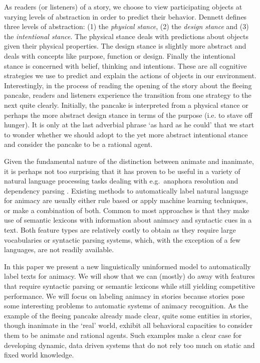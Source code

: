 \documentclass[a4paper,UKenglish]{oasics}
\begin{document}
As readers (or listeners) of a story, we choose to view participating
objects at varying levels of abstraction in order to predict their
behavior. Dennett \cite{dennett:96} defines three levels of
abstraction: (1) the \textit{physical stance}, (2) the \textit{design
  stance} and (3) the \textit{intentional stance}. The physical stance
deals with predictions about objects given their physical
properties. The design stance is slightly more abstract and deals with
concepts like purpose, function or design. Finally the intentional
stance is concerned with belief, thinking and intentions. These are
all cognitive strategies we use to predict and explain the actions of
objects in our environment. Interestingly, in the process of reading
the opening of the story about the fleeing pancake, readers and
listeners experience the transition from one strategy to the next
quite clearly. Initially, the pancake is interpreted from a physical
stance or perhaps the more abstract design stance in terms of the
purpose (i.e. to stave off hunger). It is only at the last adverbial
phrase `as hard as he could' that we start to wonder whether we should
adopt to the yet more abstract intentional stance and consider the
pancake to be a rational agent.

Given the fundamental nature of the distinction between animate and
inanimate, it is perhaps not too surprising that it has proven to be
useful in a variety of natural language processing tasks dealing with
e.g.\ anaphora resolution and dependency parsing
\cite{orasan:07,lee:13,ovr:niv:07}. Existing methods to automatically
label natural language for animacy are usually either rule based or apply
machine learning techniques, or make a combination of both. Common to
most approaches is that they make use of semantic lexicons with
information about animacy and syntactic cues in a text. Both feature
types are relatively costly to obtain as they require large
vocabularies or syntactic parsing systems, which, with the exception of a few languages, are not readily available.

In this paper we present a new linguistically uninformed model to
automatically label texts for animacy. We will show that we can (mostly)
do away with features that require syntactic parsing or semantic
lexicons while still yielding competitive performance. We will focus
on labeling animacy in stories because stories pose some interesting
problems to automatic systems of animacy recognition. As the example
of the fleeing pancake already made clear, quite some entities in
stories, though inanimate in the `real' world, exhibit all behavioral
capacities to consider them to be animate and rational agents. Such
examples make a clear case for developing dynamic, data driven systems
that do not rely too much on static and fixed world knowledge.
\end{document}
